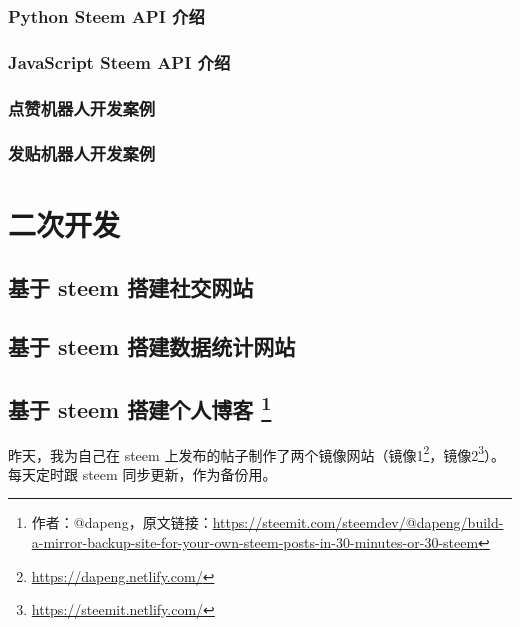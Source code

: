 \documentclass[]{ctexbook}
\renewcommand{\href}[2]{#2\footnote{\url{#1}}}
\begin{document}
\hypertarget{python_api}{%
\subsection{Python Steem API 介绍}\label{python_api}}

\hypertarget{JavaScript_api}{%
\subsection{JavaScript Steem API 介绍}\label{JavaScript_api}}

\hypertarget{upvotebot}{%
\subsection{点赞机器人开发案例}\label{upvotebot}}

\hypertarget{postbot}{%
\subsection{发贴机器人开发案例}\label{postbot}}

\hypertarget{eckfp}{%
\chapter{二次开发}\label{eckfp}}

\hypertarget{jw_steem_djsjwz}{%
\section{基于 steem 搭建社交网站}\label{jw_steem_djsjwz}}

\hypertarget{jw_steem_djsjtjwz}{%
\section{基于 steem 搭建数据统计网站}\label{jw_steem_djsjtjwz}}

\hypertarget{jw_steem_djgrbk}{%
\section[基于 steem 搭建个人博客 ]{\texorpdfstring{基于 steem 搭建个人博客 \footnote{作者：@dapeng，原文链接：\url{https://steemit.com/steemdev/@dapeng/build-a-mirror-backup-site-for-your-own-steem-posts-in-30-minutes-or-30-steem}}}{基于 steem 搭建个人博客 }}\label{jw_steem_djgrbk}}

昨天，我为自己在 steem 上发布的帖子制作了两个镜像网站（\href{https://dapeng.netlify.com/}{镜像1}，\href{https://steemit.netlify.com/}{镜像2}）。每天定时跟 steem 同步更新，作为备份用。
\end{document}

